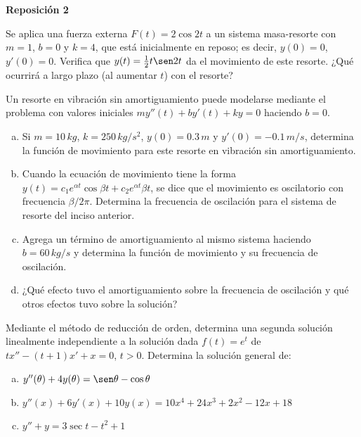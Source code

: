 \documentclass[12pt]{exam}
\begin{document}
\centering


\Large 
\textbf{\huge Reposición 2 \\ \large }

\small
\vskip10pt
\normalsize

\pointformat{\bfseries\boldmath(\thepoints)}
\vskip10pt

    
    \begin{questions}
     \question%
     Se aplica una fuerza externa $F(t)=2\cos2t$ a un sistema masa-resorte con $m=1$, $b=0$ y $k=4$, que está inicialmente en reposo; es decir, $y(0)=0$, $y'(0)=0$. Verifica que $y(t)=\frac{1}{2}t\sen2t$ da el movimiento de este resorte. ¿Qué ocurrirá a largo plazo (al aumentar $t$) con el resorte?

     \question%
     Un resorte en vibración sin amortiguamiento puede modelarse mediante el problema con valores iniciales $my''(t)+by'(t)+ky=0$ haciendo $b=0$.
     \begin{enumerate}[a)]
         \item Si $m=10\, kg$, $k=250\,kg/s^2$, $y(0)=0.3\,m$ y $y'(0)=-0.1\,m/s$, determina la función de movimiento para este resorte en vibración sin amortiguamiento.
         \item Cuando la ecuación de movimiento tiene la forma $y(t)=c_1e^{\alpha t}\cos\beta t+c_2e^{\alpha t}\beta t$, se dice que el movimiento es oscilatorio con frecuencia $\beta/2\pi$. Determina la frecuencia de oscilación para el sistema de resorte del inciso anterior.
         \item Agrega un término de amortiguamiento al mismo sistema haciendo $b=60\,kg/s$ y determina la función de movimiento y su frecuencia de oscilación.
         \item ¿Qué efecto tuvo el amortiguamiento sobre la frecuencia de oscilación y qué otros efectos tuvo sobre la solución?
     \end{enumerate}

     \question%
    Mediante el método de reducción de orden, determina una segunda solución linealmente independiente a la solución dada $f(t)=e^t$ de $tx''-(t+1)x'+x=0$,  $t>0$.  
     \question%
     Determina la solución general de:
     \begin{enumerate}[a)]
        \item	$y''(\theta)+4y(\theta)=\sen\theta-\cos\theta$
        \item	$y''(x)+6y'(x)+10y(x)=10x^4+24x^3+2x^2-12x+18$
        \item $y''+y=3\sec t-t^2+1$
     \end{enumerate}


\end{questions}
\end{document}
